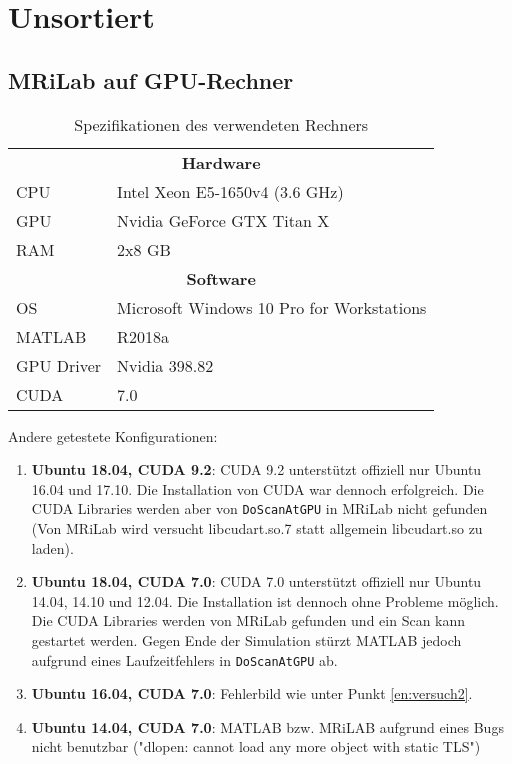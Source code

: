 \chapter{Unsortiert}

\section{MRiLab auf GPU-Rechner}

\begin{table}[H]
	\centering
	\caption{Spezifikationen des verwendeten Rechners}
	\begin{tabular}{ll}
		\toprule
		\multicolumn{2}{c}{\textbf{Hardware}} \\
		CPU & Intel Xeon E5-1650v4 (3.6 GHz) \\
		GPU & Nvidia GeForce GTX Titan X \\
		RAM & 2x8 GB \\
		\midrule
		\multicolumn{2}{c}{\textbf{Software}} \\
		OS & Microsoft Windows 10 Pro for Workstations \\
		MATLAB & R2018a \\
		GPU Driver & Nvidia 398.82 \\
		CUDA & 7.0 \\
		\bottomrule
	\end{tabular}
\end{table}

Andere getestete Konfigurationen:
\begin{enumerate}
	\item \textbf{Ubuntu 18.04, CUDA 9.2}: CUDA 9.2 unterstützt offiziell nur Ubuntu 16.04 und 17.10. Die Installation von CUDA war dennoch erfolgreich. 
	Die CUDA Libraries werden aber von \texttt{DoScanAtGPU} in MRiLab nicht gefunden (Von MRiLab wird versucht libcudart.so.7 statt allgemein libcudart.so zu laden).
	
	\item\label{en:versuch2} \textbf{Ubuntu 18.04, CUDA 7.0}: CUDA 7.0 unterstützt offiziell nur Ubuntu 14.04, 14.10 und 12.04. Die Installation ist dennoch ohne Probleme möglich. Die CUDA Libraries werden von MRiLab gefunden und ein Scan kann gestartet werden. Gegen Ende der Simulation stürzt MATLAB jedoch aufgrund eines Laufzeitfehlers in \texttt{DoScanAtGPU} ab.
	
	\item \textbf{Ubuntu 16.04, CUDA 7.0}: Fehlerbild wie unter Punkt \ref{en:versuch2}.
	
	\item \textbf{Ubuntu 14.04, CUDA 7.0}: MATLAB bzw. MRiLAB aufgrund eines Bugs nicht benutzbar ("dlopen: cannot load any more object with static TLS")
	
	
\end{enumerate}

